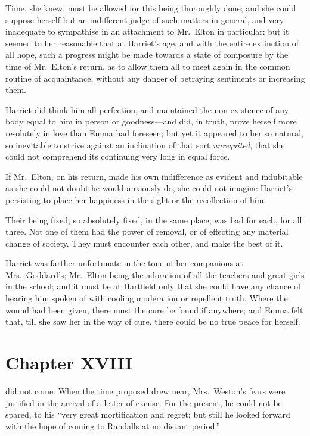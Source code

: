 Time, she knew, must be allowed for this being thoroughly done; and she
could suppose herself but an indifferent judge of such matters in general,
and very inadequate to sympathise in an attachment to Mr.\ Elton
in particular; but it seemed to her reasonable that at Harriet's age,
and with the entire extinction of all hope, such a progress might be
made towards a state of composure by the time of Mr.\ Elton's return,
as to allow them all to meet again in the common routine of acquaintance,
without any danger of betraying sentiments or increasing them.

Harriet did think him all perfection, and maintained the non-existence
of any body equal to him in person or goodness---and did, in truth,
prove herself more resolutely in love than Emma had foreseen;
but yet it appeared to her so natural, so inevitable to strive
against an inclination of that sort \emph{unrequited}, that she could not
comprehend its continuing very long in equal force.

If Mr.\ Elton, on his return, made his own indifference as evident
and indubitable as she could not doubt he would anxiously do,
she could not imagine Harriet's persisting to place her happiness
in the sight or the recollection of him.

Their being fixed, so absolutely fixed, in the same place, was bad
for each, for all three.  Not one of them had the power of removal,
or of effecting any material change of society.  They must encounter
each other, and make the best of it.

Harriet was farther unfortunate in the tone of her companions at
Mrs.\ Goddard's; Mr.\ Elton being the adoration of all the teachers
and great girls in the school; and it must be at Hartfield only
that she could have any chance of hearing him spoken of with cooling
moderation or repellent truth.  Where the wound had been given,
there must the cure be found if anywhere; and Emma felt that,
till she saw her in the way of cure, there could be no true peace
for herself.



\chapter{Chapter XVIII}


 did not come.  When the time proposed
drew near, Mrs.\ Weston's fears were justified in the arrival
of a letter of excuse.  For the present, he could not be spared,
to his ``very great mortification and regret; but still he looked
forward with the hope of coming to Randalls at no distant period.''

